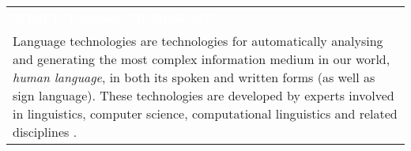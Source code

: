 {\begin{tabular}{p{\linewidth}}
  \rowcolor{orange2}\vspace{.10cm}\centerline{{\textcolor{white}{\Large\textbf{What is Language Technology?}}}}\\[-2mm]
  \rowcolor{orange2} Language technologies are technologies for automatically analysing and generating the most complex information medium in our world, \emph{human language}, in both its spoken and written forms (as well as sign language). These technologies are developed by experts involved in linguistics, computer science, computational linguistics and related disciplines \cite{jurafsky-martin01,manning-schuetze1,lt-world1,lt-survey1}.
  \vspace*{3mm} \\
  \end{tabular}
  \normalfont
}
